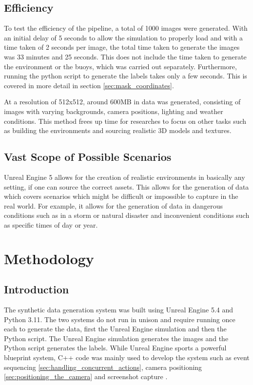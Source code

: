 \documentclass[10pt,twocolumn,letterpaper]{article}
\begin{document}
\subsection{Efficiency}

To test the efficiency of the pipeline, a total of 1000 images were generated. With an initial delay of 5 seconds to allow the simulation to properly load and with a time taken of 2 seconds per image, the total time taken to generate the images was 33 minutes and 25 seconds. This does not include the time taken to generate the environment or the buoys, which was carried out separately. Furthermore, running the python script to generate the labels takes only a few seconds. This is covered in more detail in section \ref{sec:mask_coordinates}.

At a resolution of 512x512, around 600MB in data was generated, consisting of images with varying backgrounds, camera positions, lighting and weather conditions. This method frees up time for researches to focus on other tasks such as building the environments and sourcing realistic 3D models and textures. 

\subsection{Vast Scope of Possible Scenarios}

Unreal Engine 5 allows for the creation of realistic environments in basically any setting, if one can source the correct assets. This allows for the generation of data which covers scenarios which might be difficult or impossible to capture in the real world. For example, it allows for the generation of data in dangerous conditions such as in a storm or natural disaster and inconvenient conditions such as specific times of day or year.

\section{Methodology}

\subsection{Introduction}

The synthetic data generation system was built using Unreal Engine 5.4 and Python 3.11. The two systems do not run in unison and require running once each to generate the data, first the Unreal Engine simulation and then the Python script. The Unreal Engine simulation generates the images and the Python script generates the labels. While Unreal Engine sports a powerful blueprint system, C++ code was mainly used to develop the system such as event sequencing \ref{sec:handling_concurrent_actions}, camera positioning \ref{sec:positioning_the_camera} and screenshot capture .
\end{document}

